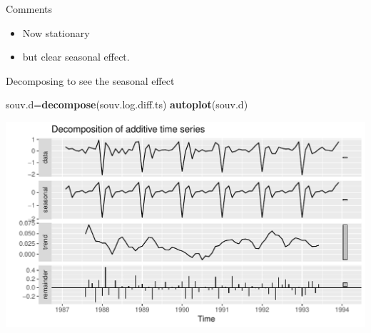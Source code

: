 \documentclass[ignorenonframetext,]{beamer}
\newenvironment{Shaded}{\begin{snugshade}}{\end{snugshade}}
\newcommand{\KeywordTok}[1]{\textcolor[rgb]{0.13,0.29,0.53}{\textbf{#1}}}
\newcommand{\NormalTok}[1]{#1}
\providecommand{\tightlist}{%
  \setlength{\itemsep}{0pt}\setlength{\parskip}{0pt}}
\begin{document}
\begin{frame}{Comments}
\protect\hypertarget{comments-2}{}

\begin{itemize}
\tightlist
\item
  Now stationary
\item
  but clear seasonal effect.
\end{itemize}

\end{frame}

\begin{frame}[fragile]{Decomposing to see the seasonal effect}
\protect\hypertarget{decomposing-to-see-the-seasonal-effect}{}

\begin{Shaded}
\begin{Highlighting}[]
\NormalTok{souv.d=}\KeywordTok{decompose}\NormalTok{(souv.log.diff.ts)}
\KeywordTok{autoplot}\NormalTok{(souv.d)}
\end{Highlighting}
\end{Shaded}

\includegraphics{figure/unnamed-chunk-37-1.pdf}

\end{frame}
\end{document}
